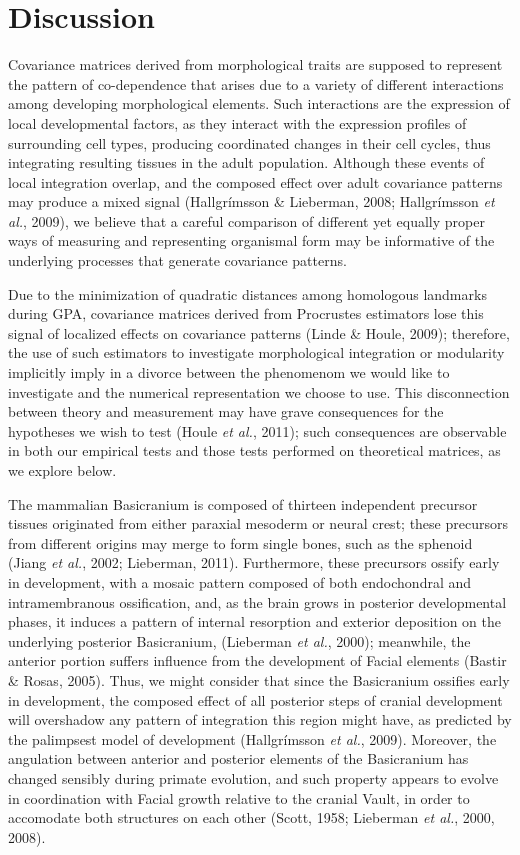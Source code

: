 \documentclass[12pt,twoside]{report}
\begin{document}
\section{Discussion}\label{discussion}

Covariance matrices derived from morphological traits are supposed to
represent the pattern of co-dependence that arises due to a variety of
different interactions among developing morphological elements. Such
interactions are the expression of local developmental factors, as they
interact with the expression profiles of surrounding cell types,
producing coordinated changes in their cell cycles, thus integrating
resulting tissues in the adult population. Although these events of
local integration overlap, and the composed effect over adult covariance
patterns may produce a mixed signal (Hallgrímsson \& Lieberman, 2008;
Hallgrímsson \emph{et al.}, 2009), we believe that a careful comparison
of different yet equally proper ways of measuring and representing
organismal form may be informative of the underlying processes that
generate covariance patterns.

Due to the minimization of quadratic distances among homologous
landmarks during GPA, covariance matrices derived from Procrustes
estimators lose this signal of localized effects on covariance patterns
(Linde \& Houle, 2009); therefore, the use of such estimators to
investigate morphological integration or modularity implicitly imply in
a divorce between the phenomenom we would like to investigate and the
numerical representation we choose to use. This disconnection between
theory and measurement may have grave consequences for the hypotheses we
wish to test (Houle \emph{et al.}, 2011); such consequences are
observable in both our empirical tests and those tests performed on
theoretical matrices, as we explore below.

The mammalian Basicranium is composed of thirteen independent precursor
tissues originated from either paraxial mesoderm or neural crest; these
precursors from different origins may merge to form single bones, such
as the sphenoid (Jiang \emph{et al.}, 2002; Lieberman, 2011).
Furthermore, these precursors ossify early in development, with a mosaic
pattern composed of both endochondral and intramembranous ossification,
and, as the brain grows in posterior developmental phases, it induces a
pattern of internal resorption and exterior deposition on the underlying
posterior Basicranium, (Lieberman \emph{et al.}, 2000); meanwhile, the
anterior portion suffers influence from the development of Facial
elements (Bastir \& Rosas, 2005). Thus, we might consider that since the
Basicranium ossifies early in development, the composed effect of all
posterior steps of cranial development will overshadow any pattern of
integration this region might have, as predicted by the palimpsest model
of development (Hallgrímsson \emph{et al.}, 2009). Moreover, the
angulation between anterior and posterior elements of the Basicranium
has changed sensibly during primate evolution, and such property appears
to evolve in coordination with Facial growth relative to the cranial
Vault, in order to accomodate both structures on each other (Scott,
1958; Lieberman \emph{et al.}, 2000, 2008).
\end{document}
